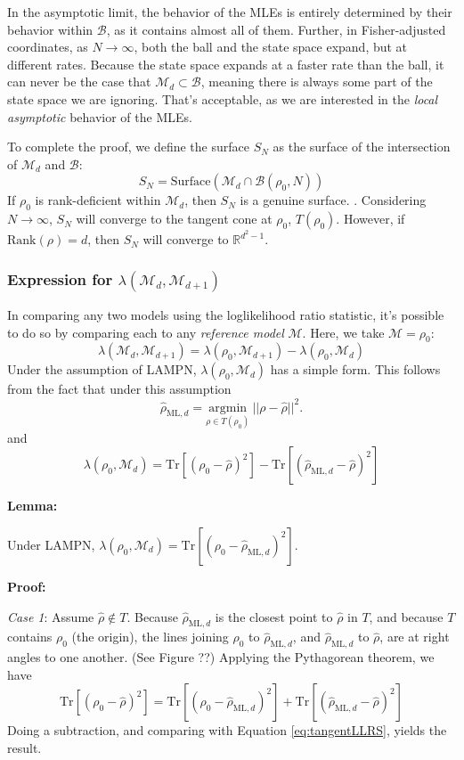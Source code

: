 \documentclass[aps,pra, twocolumn]{revtex4-1}
\newcommand{\M}{\mathcal{M}}
\newcommand{\rhohat}{\hat{\rho}}
\newcommand{\rhoML}[1]{\rhohat_{\scriptscriptstyle{\mathrm{ML},#1}}}
\begin{document}
In the asymptotic limit, the behavior of the MLEs is entirely determined by their behavior within $\mathcal{B}$, as it contains almost all of them. Further, in Fisher-adjusted coordinates, as $N\rightarrow \infty$, both the ball and the state space expand, but at different rates. Because the state space expands at a faster rate than the ball, it can never be the case that $\M_{d}\subset \mathcal{B}$, meaning there is always some part of the state space we are ignoring. That's acceptable, as we are interested in the \emph{local asymptotic} behavior of the MLEs.

To complete the proof, we define the surface $S_{N}$ as the surface of the intersection of $\M_{d}$ and $\mathcal{B}$:
\[S_{N} = \text{Surface}(\M_{d} \cap \mathcal{B}(\rho_{0}, N))\]
If $\rho_{0}$ is rank-deficient within $\M_{d}$, then $S_{N}$ is a genuine surface. . Considering $N \rightarrow \infty$, $S_{N}$ will converge to the tangent cone at $\rho_{0}$, $T(\rho_{0})$. However, if $\mathrm{Rank}(\rho)  = d$, then $S_{N}$ will converge to $\mathbb{R}^{d^{2}-1}$.

\subsubsection{Expression for $\lambda(\M_{d}, \M_{d+1})$}

In comparing any two models using the loglikelihood ratio statistic, it's possible to do so by comparing each to any \emph{reference model} $\M$. Here, we take $\M = \rho_{0}$:
\[\lambda(\M_{d}, \M_{d+1}) = \lambda(\rho_{0},\M_{d+1}) - \lambda(\rho_{0},\M_{d})\]
Under the assumption of LAMPN, $\lambda(\rho_{0}, \M_{d})$ has a simple form. This follows from the fact that under this assumption
\[\rhoML{d} = \underset{\rho \in T(\rho_{0})}{\text{argmin}}~||\rho  -\hat{\rho}||^{2}.\]
and
\begin{equation}
\label{eq:tangentLLRS}
\lambda(\rho_{0}, \M_{d}) = \mathrm{Tr}[(\rho_{0} -\hat{\rho})^{2}] -   \mathrm{Tr}[(\rhoML{d} - \hat{\rho})^{2}]
\end{equation}

\textbf{Lemma:}

Under LAMPN, $\lambda(\rho_{0}, \M_{d}) = \mathrm{Tr}[(\rho_{0} - \rhoML{d})^{2}]$.

\textbf{Proof:}

\emph{Case 1}: Assume $\hat{\rho} \not \in T$. Because $\rhoML{d}$ is the closest point to $\hat{\rho}$ in $T$, and because $T$ contains $\rho_{0}$ (the origin), the lines joining $\rho_{0}$ to $\rhoML{d}$, and $\rhoML{d}$ to $\hat{\rho}$, are at right angles to one another. (See Figure ??) Applying the Pythagorean theorem, we have
\begin{equation}
\label{eq:pythag}
\mathrm{Tr}[(\rho_{0} -\hat{\rho})^{2}] =  \mathrm{Tr}[(\rho_{0} - \rhoML{d})^{2}] + \mathrm{Tr}[(\rhoML{d} - \hat{\rho})^{2}]
\end{equation}
Doing a subtraction, and comparing with Equation \eqref{eq:tangentLLRS}, yields the result.
\end{document}
